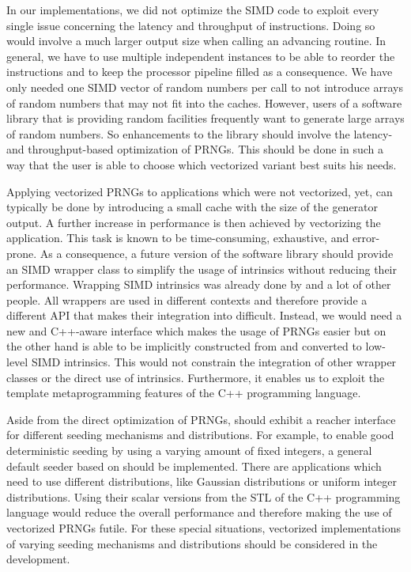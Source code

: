 \documentclass[crop=false]{stdlocal}
\begin{document}
  In our implementations, we did not optimize the SIMD code to exploit every single issue concerning the latency and throughput of instructions.
  Doing so would involve a much larger output size when calling an advancing routine.
  In general, we have to use multiple independent instances to be able to reorder the instructions and to keep the processor pipeline filled as a consequence.
  We have only needed one SIMD vector of random numbers per call to not introduce arrays of random numbers that may not fit into the caches.
  However, users of a software library that is providing random facilities frequently want to generate large arrays of random numbers.
  So enhancements to the library should involve the latency- and throughput-based optimization of PRNGs.
  This should be done in such a way that the user is able to choose which vectorized variant best suits his needs.

  Applying vectorized PRNGs to applications which were not vectorized, yet, can typically be done by introducing a small cache with the size of the generator output.
  A further increase in performance is then achieved by vectorizing the application.
  This task is known to be time-consuming, exhaustive, and error-prone.
  As a consequence, a future version of the software library should provide an SIMD wrapper class to simplify the usage of intrinsics without reducing their performance.
  Wrapping SIMD intrinsics was already done by \citeauthor{fog2019a} \autocite{fog2019a} and a lot of other people.
  All wrappers are used in different contexts and therefore provide a different API that makes their integration into  difficult.
  Instead, we would need a new and C++-aware interface which makes the usage of PRNGs easier but on the other hand is able to be implicitly constructed from and converted to low-level SIMD intrinsics.
  This would not constrain the integration of other wrapper classes or the direct use of intrinsics.
  Furthermore, it enables us to exploit the template metaprogramming features of the C++ programming language.

  Aside from the direct optimization of PRNGs,  should exhibit a reacher interface for different seeding mechanisms and distributions.
  For example, to enable good deterministic seeding by using a varying amount of fixed integers, a general default seeder based on \textcite{oneill-blog-seed-seq} should be implemented.
  There are applications which need to use different distributions, like Gaussian distributions or uniform integer distributions.
  Using their scalar versions from the STL of the C++ programming language would reduce the overall performance and therefore making the use of vectorized PRNGs futile.
  For these special situations, vectorized implementations of varying seeding mechanisms and distributions should be considered in the development.
\end{document}
